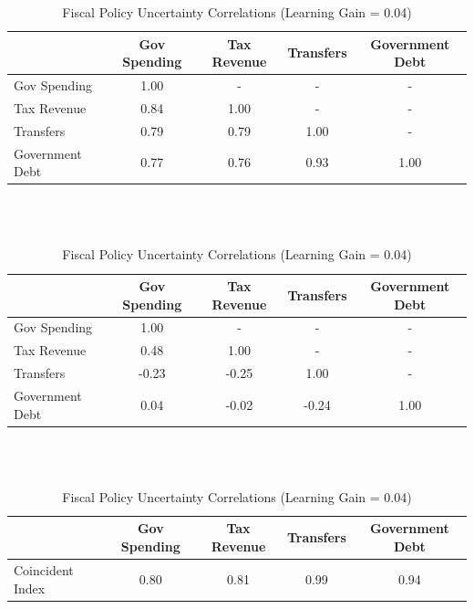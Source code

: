\documentclass[11pt]{article}
\begin{document}
\begin{table}[t]\caption{Fiscal Policy Uncertainty Correlations (Learning Gain = 0.04)}\label{tb:fpucorrel0.04}
\begin{center}
\begin{tabular}{l|cccc}
 & Gov Spending & Tax Revenue & Transfers & Government Debt \\ \hline
Gov Spending & 1.00 & - & - & - \\
Tax Revenue & 0.84 & 1.00 & - & - \\
Transfers & 0.79 & 0.79 & 1.00 & - \\
Government Debt & 0.77 & 0.76 & 0.93 & 1.00 \\ \hline
\end{tabular}

\ \\ \ \\

\begin{tabular}{l|cccc}
 & Gov Spending & Tax Revenue & Transfers & Government Debt \\ \hline
Gov Spending & 1.00 & - & - & - \\
Tax Revenue & 0.48 & 1.00 & - & - \\
Transfers & -0.23 & -0.25 & 1.00 & - \\
Government Debt & 0.04 & -0.02 & -0.24 & 1.00 \\ \hline
\end{tabular}

\ \\ \ \\

\begin{tabular}{l|cccc}
 & Gov Spending & Tax Revenue & Transfers & Government Debt \\ \hline
Coincident Index~ & 0.80 & 0.81 & 0.99 & 0.94 \\ \hline
\end{tabular}
\end{center}
\end{table}








\end{document}
